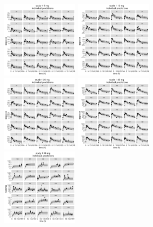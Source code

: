 \documentclass[11pt]{amsart}
\begin{document}
\begin{figure}[htbp]
\includegraphics[width=1.5in,trim=0in 0in 0 0in]{graphics/effCptModelTorsten/effCptModelTorstenPlots019.pdf}
\includegraphics[width=1.5in,trim=0in 0in 0 0in]{graphics/effCptModelTorsten/effCptModelTorstenPlots020.pdf}
\includegraphics[width=1.5in,trim=0in 0in 0 0in]{graphics/effCptModelTorsten/effCptModelTorstenPlots021.pdf}
\includegraphics[width=1.5in,trim=0in 0in 0 0in]{graphics/effCptModelTorsten/effCptModelTorstenPlots022.pdf}
\includegraphics[width=1.5in,trim=0in 0in 0 0in]{graphics/effCptModelTorsten/effCptModelTorstenPlots023.pdf}

\end{figure}
\end{document}
